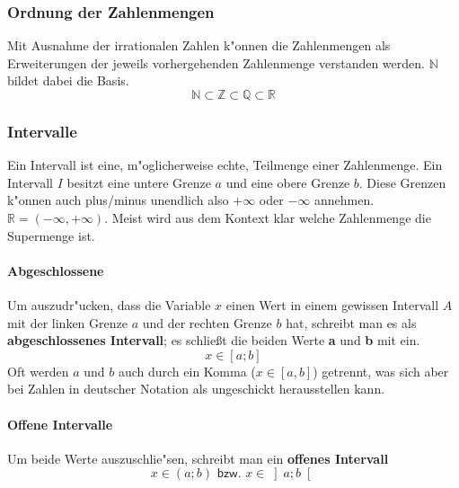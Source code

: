 \subsubsection{Ordnung der Zahlenmengen} 
Mit Ausnahme der irrationalen Zahlen k"onnen die Zahlenmengen als Erweiterungen der jeweils vorhergehenden Zahlenmenge verstanden werden. $\mathbb{N}$ bildet dabei die Basis.
\begin{equation*}
 \mathbb{N} \subset \mathbb{Z} \subset \mathbb{Q} \subset \mathbb{R}
\end{equation*}

\subsubsection{Intervalle}
Ein Intervall ist eine, m"oglicherweise echte, Teilmenge einer Zahlenmenge. Ein Intervall $I$ besitzt eine untere Grenze $a$ und eine obere Grenze $b$. Diese Grenzen k"onnen auch plus/minus unendlich also $+ \infty$ oder $- \infty$ annehmen. $\mathbb{R} = \left(-\infty, +\infty\right)$. Meist wird aus dem Kontext klar welche Zahlenmenge die Supermenge ist.

\paragraph{Abgeschlossene}
\begin{flushleft}
Um auszudr"ucken, dass die Variable $x$ einen Wert in einem gewissen Intervall $A$ mit der linken Grenze $a$ und der rechten Grenze $b$ hat, schreibt man es als \textbf{abgeschlossenes Intervall}; es schließt die beiden Werte \textbf{a} und \textbf{b} mit ein. 
\begin{equation*}
x \in \left[a;b \right]
\end{equation*}
Oft werden $a$ und $b$ auch durch ein Komma ($x \in \left[a,b \right]$) getrennt, was sich aber bei Zahlen in deutscher Notation als ungeschickt herausstellen kann.
\end{flushleft}

\paragraph{Offene Intervalle}
\begin{flushleft}
Um beide Werte auszuschlie"sen, schreibt man ein \textbf{offenes Intervall}
\begin{equation*}
x \in (a;b) \textsf{ bzw. } x \in \left]a;b \right[
\end{equation*}
\end{flushleft}


